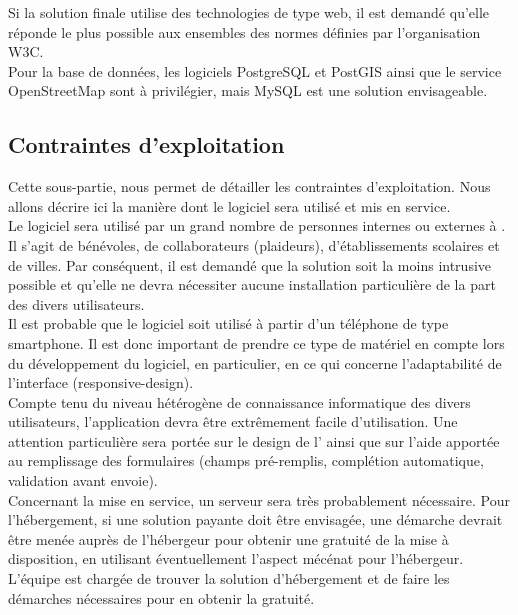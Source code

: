 Si la solution finale utilise des technologies de type web, il est demandé qu'elle réponde le plus possible aux ensembles des normes définies par l'organisation W3C.\\

Pour la base de données, les logiciels PostgreSQL et PostGIS ainsi que le service OpenStreetMap sont à privilégier, mais MySQL est une solution envisageable.\\





\subsection{Contraintes d'exploitation}
Cette sous-partie, nous permet de détailler les contraintes d'exploitation. Nous allons décrire ici la manière dont le logiciel sera utilisé et mis en service.\\

Le logiciel sera utilisé par un grand nombre de personnes internes ou externes à \nomClient{}. Il s'agit de bénévoles, de collaborateurs (plaideurs), d'établissements scolaires et de villes. Par conséquent, il est demandé que la solution soit la moins intrusive possible et qu'elle ne devra nécessiter aucune installation particulière de la part des divers utilisateurs.\\

Il est probable que le logiciel soit utilisé à partir d'un téléphone de type smartphone. Il est donc important de prendre ce type de matériel en compte lors du développement du logiciel, en particulier, en ce qui concerne l'adaptabilité de l'interface (responsive-design).\\

Compte tenu du niveau hétérogène de connaissance informatique des divers utilisateurs, l'application devra être extrêmement facile d'utilisation. Une attention particulière sera portée sur le design de l'\IHM{} ainsi que sur l'aide apportée au remplissage des formulaires (champs pré-remplis, complétion automatique, validation avant envoie).\\

Concernant la mise en service, un serveur sera très probablement nécessaire. Pour l'hébergement, si une solution payante doit être envisagée, une démarche devrait être menée auprès de l'hébergeur pour obtenir une gratuité de la mise à disposition, en utilisant éventuellement l'aspect mécénat pour l'hébergeur. L'équipe \PICCourt{} est chargée de trouver la solution d'hébergement et de faire les démarches nécessaires pour en obtenir la gratuité.\\

